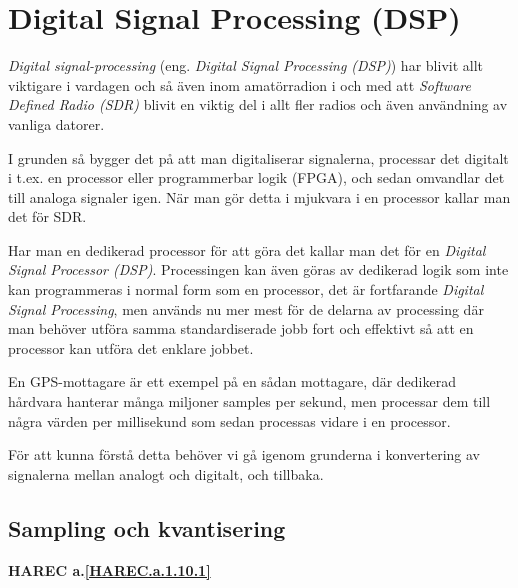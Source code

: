 \section{Digital Signal Processing (DSP)}
\label{DSP}

\begin{rev-nytt}[MAD]

\emph{Digital signal-processing} (eng. \emph{Digital Signal Processing (DSP)})
har blivit allt viktigare i vardagen och så även inom amatörradion i och med
att \emph{Software Defined Radio (SDR)} blivit en viktig del i allt fler
radios och även användning av vanliga datorer.

I grunden så bygger det på att man digitaliserar signalerna, processar det
digitalt i t.ex. en processor eller programmerbar logik (FPGA), och sedan
omvandlar det till analoga signaler igen. När man gör detta i mjukvara i en
processor kallar man det för SDR.

Har man en dedikerad processor för att göra det kallar man det för en
\emph{Digital Signal Processor (DSP)}. Processingen kan även göras av dedikerad
logik som inte kan programmeras i normal form som en processor, det är
fortfarande \emph{Digital Signal Processing}, men används
nu mer mest för de delarna av processing där man behöver utföra samma
standardiserade jobb fort och effektivt så att en processor kan utföra det
enklare jobbet.

En GPS-mottagare är ett exempel på en sådan mottagare, där dedikerad hårdvara
hanterar många miljoner samples per sekund, men processar dem till några värden
per millisekund som sedan processas vidare i en processor.

För att kunna förstå detta behöver vi gå igenom grunderna i konvertering av
signalerna mellan analogt och digitalt, och tillbaka.

\end{rev-nytt}

\subsection{Sampling och kvantisering}
\textbf{HAREC a.\ref{HAREC.a.1.10.1}\label{myHAREC.a.1.10.1}}

